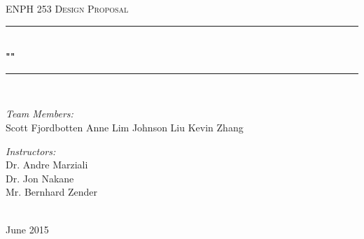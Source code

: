 \documentclass[11pt, oneside]{article} %
\begin{document}


\newcommand{\HRule}{\rule{\linewidth}{0.5mm}} %



\begin{titlepage}
\begin{center}

\textsc{\LARGE ENPH 253 Design Proposal}\\[1.5cm]

\HRule \\[0.4cm] %
{\huge \bfseries ""}\\[0.4cm] %
\HRule \\[1.5cm] %
 
\begin{minipage}[t]{0.4\textwidth}
\begin{flushleft} \large
\emph{Team Members:}\\
{Scott Fjordbotten \newline Anne Lim \newline Johnson Liu \newline Kevin Zhang} %
\end{flushleft}
\end{minipage}
\begin{minipage}[t]{0.4\textwidth}
\begin{flushright} \large
\emph{Instructors:} \\
{Dr. Andre Marziali \\ Dr. Jon Nakane \\ Mr. Bernhard Zender} %
\end{flushright}
\end{minipage}\\[3cm]
 
 
{\large June 2015}\\[4cm]
 
\vfill
\end{center}

\end{titlepage}



\end{document}
